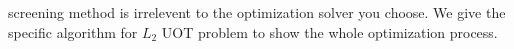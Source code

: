 screening method is irrelevent to the optimization solver you choose. We give the specific algorithm for $L_2$ UOT problem to show the whole optimization process.\\











































